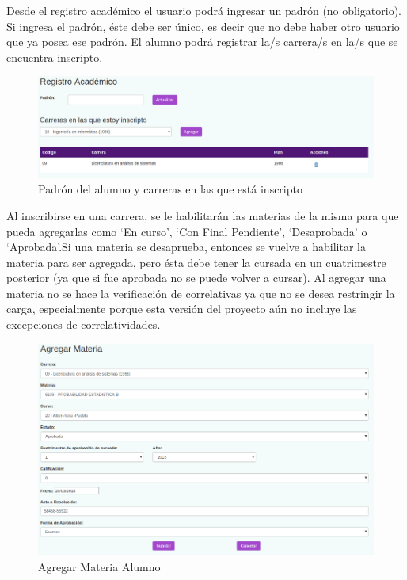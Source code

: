 \documentclass[a4paper]{article}
\begin{document}
Desde el registro académico el usuario podrá ingresar un padrón (no obligatorio). Si ingresa el padrón, éste debe ser único, es decir que no debe haber otro usuario que ya posea ese padrón.
El alumno podrá registrar la/s carrera/s en la/s que se encuentra inscripto.\newline 

\begin{figure}[H]
\centering
\includegraphics[scale=0.3]{Imagenes/padron_y_carreras.png}\par
\caption{Padrón del alumno y carreras en las que está inscripto}
\end{figure}

Al inscribirse en una carrera, se le habilitarán las materias de la misma para que pueda agregarlas como `En curso', `Con Final Pendiente', `Desaprobada' o `Aprobada'.Si una materia se desaprueba, entonces se vuelve a habilitar la materia para ser agregada, pero ésta debe tener la cursada en un cuatrimestre posterior (ya que si fue aprobada no se puede volver a cursar).
Al agregar una materia no se hace la verificación de correlativas ya que no se desea restringir la carga, especialmente porque esta versión del proyecto aún no incluye las excepciones de correlatividades.\newline

\begin{figure}[H]
\centering
\includegraphics[scale=0.4]{Imagenes/agregar_materia.png}\par
\caption{Agregar Materia Alumno}
\end{figure}
\end{document}
